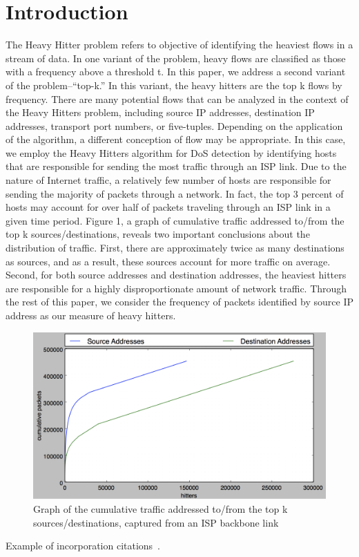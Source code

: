\section{Introduction}
\label{sec:intro}
The Heavy Hitter problem refers to objective of identifying the heaviest flows in a stream of data. In one variant of the problem, heavy flows are classified as those with a frequency above a threshold t. In this paper, we address a second variant of the problem--``top-k.'' In this variant, the heavy hitters are the top k flows by frequency. 
There are many potential flows that can be analyzed in the context of the Heavy Hitters problem, including source IP addresses, destination IP addresses, transport port numbers, or five-tuples. Depending on the application of the algorithm, a different conception of flow may be appropriate. In this case, we employ the Heavy Hitters algorithm for DoS detection by identifying hosts that are responsible for sending the most traffic through an ISP link. Due to the nature of Internet traffic, a relatively few number of hosts are responsible for sending the majority of packets through a network. In fact, the top 3 percent of hosts may account for over half of packets traveling through an ISP link in a given time period. Figure 1, a graph of cumulative traffic addressed to/from the top k sources/destinations, reveals two important conclusions about the distribution of traffic. First, there are approximately twice as many destinations as sources, and as a result, these sources account for more traffic on average. Second, for both source addresses and destination addresses, the heaviest hitters are responsible for a highly disproportionate amount of network traffic. Through the rest of this paper, we consider the frequency of packets identified by source IP address as our measure of heavy hitters.

\begin{figure}[t]
  \centering
    \includegraphics[scale=0.3]{cumulative}
     \caption{Graph of the cumulative traffic addressed to/from the top k sources/destinations, captured from an ISP backbone link}
     \label{fig:bp-image}
\end{figure}

Example of incorporation citations~\cite{coral:nsdi04}.

